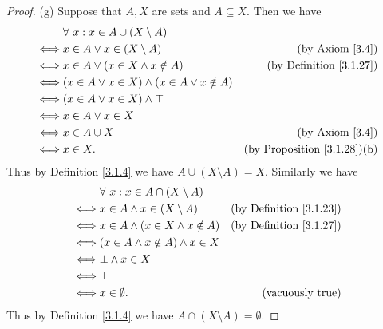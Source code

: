 \begin{proof}{(g)}
    Suppose that \(A, X\) are sets and \(A \subseteq X\).
    Then we have
    \begin{align*}
             & \forall\ x : x \in A \cup (X \setminus A)                                                        \\
        \iff & x \in A \lor x \in (X \setminus A)                     & \text{(by Axiom \ref{3.4})}             \\
        \iff & x \in A \lor (x \in X \land x \notin A)                & \text{(by Definition \ref{3.1.27})}     \\
        \iff & (x \in A \lor x \in X) \land (x \in A \lor x \notin A)                                           \\
        \iff & (x \in A \lor x \in X) \land \top                                                                \\
        \iff & x \in A \lor x \in X                                                                             \\
        \iff & x \in A \cup X                                         & \text{(by Axiom \ref{3.4})}             \\
        \iff & x \in X.                                               & \text{(by Proposition \ref{3.1.28})(b)}
    \end{align*}
    Thus by Definition \ref{3.1.4} we have \(A \cup (X \setminus A) = X\).
    Similarly we have
    \begin{align*}
             & \forall\ x : x \in A \cap (X \setminus A)                                       \\
        \iff & x \in A \land x \in (X \setminus A)       & \text{(by Definition \ref{3.1.23})} \\
        \iff & x \in A \land (x \in X \land x \notin A)  & \text{(by Definition \ref{3.1.27})} \\
        \iff & (x \in A \land x \notin A) \land x \in X                                        \\
        \iff & \bot \land x \in X                                                              \\
        \iff & \bot                                                                            \\
        \iff & x \in \emptyset.                          & \text{(vacuously true)}
    \end{align*}
    Thus by Definition \ref{3.1.4} we have \(A \cap (X \setminus A) = \emptyset\).
\end{proof}

